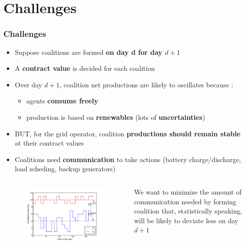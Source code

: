 \documentclass[xcolor=dvipsnames]{beamer}
\begin{document}
%
%
\section{Challenges}
\begin{frame}
	\frametitle{Challenges}
	
	\begin{footnotesize}
	\begin{itemize}
		\item Suppose coalitions are formed \textbf{on day d for day $ d +1 $}
		\item A \textbf{contract value} is decided for each coalition
		\item Over day $ d +1 $, coalition net productions are likely to oscillates because :
			\begin{itemize}
				\item {\scriptsize agents \textbf{consume freely}}
				\item {\scriptsize production is based on \textbf{renewables} (lots of \textbf{uncertainties})}
			\end{itemize}
		\item BUT, for the grid operator, coalition \textbf{productions should remain stable} at their contract values
		\item Coalitions need \textbf{communication} to take actions (battery charge/discharge, load scheding, backup generators)
	\end{itemize}
	\end{footnotesize}
	
	\begin{columns}
		\begin{column}{.7 \linewidth}
			\begin{figure}
				\includegraphics[scale=.38]{production.pdf}
			\end{figure}
		\end{column}
		\begin{column}{.3 \linewidth}
			{\scriptsize We want to minimize the amount of communication needed by forming coalition that, statistically speaking, will be likely to deviate less on day $d+1$ }
		\end{column}
	\end{columns}

\end{frame}
	
\end{document}
